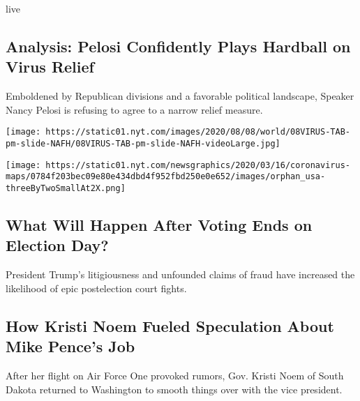 live

\href{/2020/08/08/us/politics/nancy-pelosi-coronavirus-relief.html}{}

\hypertarget{analysis-pelosi-confidently-plays-hardball-on-virus-relief}{%
\subsection{Analysis: Pelosi Confidently Plays Hardball on Virus
Relief}\label{analysis-pelosi-confidently-plays-hardball-on-virus-relief}}

Emboldened by Republican divisions and a favorable political landscape,
Speaker Nancy Pelosi is refusing to agree to a narrow relief measure.

\texttt{[image: https://static01.nyt.com/images/2020/08/08/world/08VIRUS-TAB-pm-slide-NAFH/08VIRUS-TAB-pm-slide-NAFH-videoLarge.jpg]}

\texttt{[image: https://static01.nyt.com/newsgraphics/2020/03/16/coronavirus-maps/0784f203bec09e80e434dbd4f952fbd250e0e652/images/orphan\_usa-threeByTwoSmallAt2X.png]}

\href{/2020/08/08/us/politics/voting-nov-3-election.html}{}

\hypertarget{what-will-happen-after-voting-ends-on-election-day}{%
\subsection{What Will Happen After Voting Ends on Election
Day?}\label{what-will-happen-after-voting-ends-on-election-day}}

President Trump's litigiousness and unfounded claims of fraud have
increased the likelihood of epic postelection court fights.

\href{/2020/08/08/us/politics/kristi-noem-pence-trump.html}{}

\hypertarget{how-kristi-noem-fueled-speculation-about-mike-pences-job}{%
\subsection{How Kristi Noem Fueled Speculation About Mike Pence's
Job}\label{how-kristi-noem-fueled-speculation-about-mike-pences-job}}

After her flight on Air Force One provoked rumors, Gov. Kristi Noem of
South Dakota returned to Washington to smooth things over with the vice
president.

\href{/2020/08/08/magazine/us-russia-intelligence.html}{}

